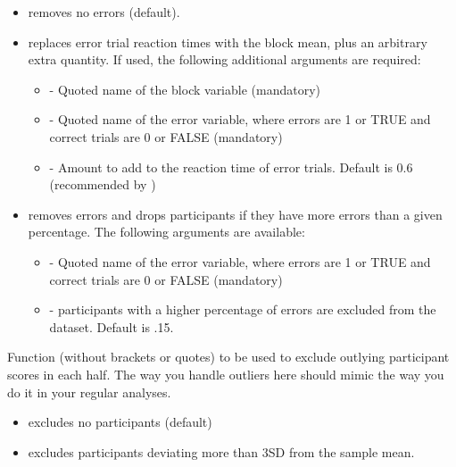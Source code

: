 \documentclass[a4paper]{book}
\begin{document}
\begin{Arguments}
\begin{ldescription}
\begin{itemize}

\item{}  removes no errors (default).
\item{}  replaces error trial reaction times with the block mean, plus an arbitrary extra quantity.
If used, the following additional arguments are required:
\begin{itemize}

\item{}  - Quoted name of the block variable (mandatory)
\item{}  - Quoted name of the error variable, where errors are 1 or TRUE and correct trials are 0 or FALSE (mandatory)
\item{}  - Amount to add to the reaction time of error trials. Default is 0.6 (recommended by )

\end{itemize}

\item{}  removes errors and drops participants if they have more errors than a given percentage. The following arguments are available:
\begin{itemize}

\item{}  - Quoted name of the error variable, where errors are 1 or TRUE and correct trials are 0 or FALSE (mandatory)
\item{}  - participants with a higher percentage of errors are excluded from the dataset. Default is .15.

\end{itemize}


\end{itemize}


\item[\code{casedropfunc}] Function (without brackets or quotes) to be used to exclude outlying participant scores in each half.
The way you handle outliers here should mimic the way you do it in your regular analyses.
\begin{itemize}

\item{}  excludes no participants (default)
\item{}  excludes participants deviating more than 3SD from the sample mean.


\end{itemize}
\end{ldescription}
\end{Arguments}
\end{document}
